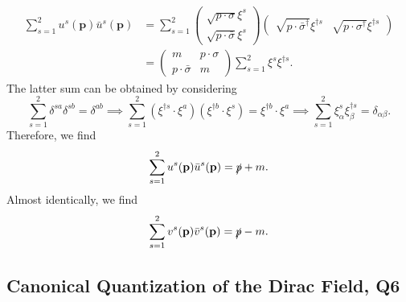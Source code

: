 \begin{solution}
    \begin{equation}
        \begin{aligned}
            \sum_{s=1}^{2} u^s(\mathbf{p})\bar{u}^s(\mathbf{p}) &= \sum_{s=1}^2
            \begin{pmatrix}
         \sqrt{p\cdot \sigma}\xi^s\\\sqrt{p\cdot\bar{\sigma}}\xi^s
     \end{pmatrix}\begin{pmatrix}
         \sqrt{p\cdot\bar{\sigma}^\dagger}\xi^{\dagger s}&\sqrt{p\cdot \sigma^\dagger}\xi^{\dagger s}
     \end{pmatrix}
     \\
     &=\begin{pmatrix}
         m&p\cdot\sigma\\
         p\cdot \bar\sigma&m
     \end{pmatrix}\sum_{s=1}^2\xi^s\xi^{\dagger s}.
        \end{aligned}
    \end{equation}
    The latter sum can be obtained by considering
    \begin{equation}
        \sum_{s=1}^2\delta^{sa}\delta^{sb} = \delta^{ab}\implies \sum   _{s=1}^2(\xi ^{\dagger s}\cdot\xi^a)(\xi ^{\dagger b}\cdot\xi^s)  =\xi^{\dagger b}\cdot\xi^a \implies \sum_{s=1}^2\xi^s_\alpha\xi^{\dagger s}_\beta = \delta_{\alpha\beta}.
    \end{equation}
    Therefore, we find
    \begin{equation}
        \sum_{s=1}^{2} u^s(\mathbf{p})\bar{u}^s(\mathbf{p})  = \slashed{p} +m.
    \end{equation}
    Almost identically, we find
    \begin{equation}
        \sum_{s=1}^{2} v^s(\mathbf{p})\bar{v}^s(\mathbf{p}) = \slashed{p} - m.
    \end{equation}
\end{solution}

\subsection{Canonical Quantization of the Dirac Field, Q6}

